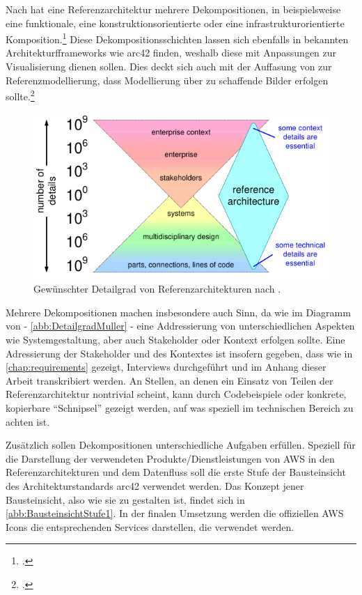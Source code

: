 Nach \citeauthor{Muller.2020} hat eine Referenzarchitektur mehrere Dekompositionen, in beispielsweise eine funktionale, eine konstruktionsorientierte oder eine infrastrukturorientierte Komposition.\footcite[Vgl.][7]{Muller.2020} Diese Dekompositionsschichten lassen sich ebenfalls in bekannten Architekturfframeworks wie arc42 finden, weshalb diese mit Anpassungen zur Visualisierung dienen sollen. Dies deckt sich auch mit der Auffasung von \citeauthor{Schutte.1998} zur Referenzmodellierung, dass Modellierung über zu schaffende Bilder erfolgen sollte.\footcite[Vgl.][185]{Schutte.1998}

\begin{figure}[H]
\centering
\includegraphics[height=0.23\textheight]{graphics/reference-architecture-details.pdf}
\caption[Gewünschter Detailgrad von Referenzarchitekturen nach \citeauthor{Muller.2020}]{Gewünschter Detailgrad von Referenzarchitekturen nach \citeauthor{Muller.2020}.\footnotemark}
\label{abb:DetailgradMuller}
\end{figure}

Mehrere Dekompositionen machen insbesondere auch Sinn, da wie im Diagramm von \citeauthor{Muller.2020} - \autoref{abb:DetailgradMuller} - eine Addressierung von unterschiedlichen Aspekten wie Systemgestaltung, aber auch Stakeholder oder Kontext erfolgen sollte. Eine Adressierung der Stakeholder und des Kontextes ist insofern gegeben, dass wie in \autoref{chap:requirements} gezeigt, Interviews durchgeführt und im Anhang dieser Arbeit transkribiert werden. An Stellen, an denen ein Einsatz von Teilen der Referenzarchitektur nontrivial scheint, kann durch Codebeispiele oder konkrete, kopierbare \enquote{Schnipsel} gezeigt werden, auf was speziell im technischen Bereich zu achten ist.

Zusätzlich sollen Dekompositionen unterschiedliche Aufgaben erfüllen. Speziell für die Darstellung der verwendeten Produkte/Dienstleistungen von \ac{AWS} in den Referenzarchitekturen und dem Datenfluss soll die erste Stufe der Bausteinsicht des Architekturstandards arc42 verwendet werden. Das Konzept jener Bausteinsicht, also wie sie zu gestalten ist, findet sich in \autoref{abb:BausteinsichtStufe1}. In der finalen Umsetzung werden die offiziellen \ac{AWS} Icons die entsprechenden Services darstellen, die verwendet werden.


